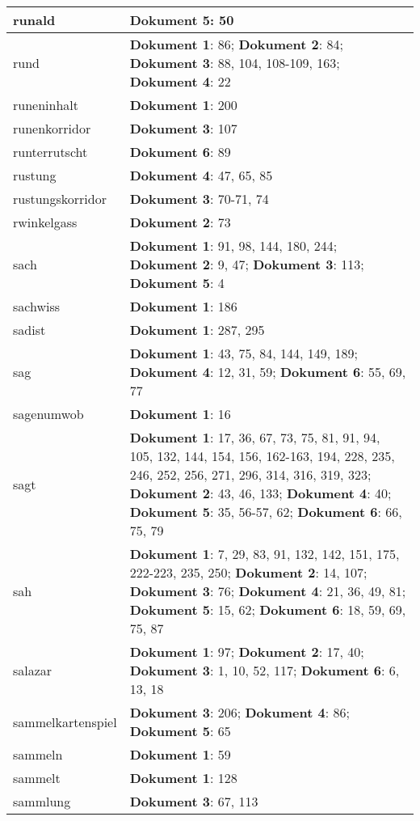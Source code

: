 \documentclass[a5paper]{article}
\begin{document}
\begin{longtable}[l]{|l|p{3in}|}
\hline
runald & \textbf{Dokument 5}: 50 \\
\hline
rund & \textbf{Dokument 1}: 86; \textbf{Dokument 2}: 84; \textbf{Dokument 3}: 88, 104, 108-109, 163; \textbf{Dokument 4}: 22 \\
\hline
runeninhalt & \textbf{Dokument 1}: 200 \\
\hline
runenkorridor & \textbf{Dokument 3}: 107 \\
\hline
runterrutscht & \textbf{Dokument 6}: 89 \\
\hline
rustung & \textbf{Dokument 4}: 47, 65, 85 \\
\hline
rustungskorridor & \textbf{Dokument 3}: 70-71, 74 \\
\hline
rwinkelgass & \textbf{Dokument 2}: 73 \\
\hline
sach & \textbf{Dokument 1}: 91, 98, 144, 180, 244; \textbf{Dokument 2}: 9, 47; \textbf{Dokument 3}: 113; \textbf{Dokument 5}: 4 \\
\hline
sachwiss & \textbf{Dokument 1}: 186 \\
\hline
sadist & \textbf{Dokument 1}: 287, 295 \\
\hline
sag & \textbf{Dokument 1}: 43, 75, 84, 144, 149, 189; \textbf{Dokument 4}: 12, 31, 59; \textbf{Dokument 6}: 55, 69, 77 \\
\hline
sagenumwob & \textbf{Dokument 1}: 16 \\
\hline
sagt & \textbf{Dokument 1}: 17, 36, 67, 73, 75, 81, 91, 94, 105, 132, 144, 154, 156, 162-163, 194, 228, 235, 246, 252, 256, 271, 296, 314, 316, 319, 323; \textbf{Dokument 2}: 43, 46, 133; \textbf{Dokument 4}: 40; \textbf{Dokument 5}: 35, 56-57, 62; \textbf{Dokument 6}: 66, 75, 79 \\
\hline
sah & \textbf{Dokument 1}: 7, 29, 83, 91, 132, 142, 151, 175, 222-223, 235, 250; \textbf{Dokument 2}: 14, 107; \textbf{Dokument 3}: 76; \textbf{Dokument 4}: 21, 36, 49, 81; \textbf{Dokument 5}: 15, 62; \textbf{Dokument 6}: 18, 59, 69, 75, 87 \\
\hline
salazar & \textbf{Dokument 1}: 97; \textbf{Dokument 2}: 17, 40; \textbf{Dokument 3}: 1, 10, 52, 117; \textbf{Dokument 6}: 6, 13, 18 \\
\hline
sammelkartenspiel & \textbf{Dokument 3}: 206; \textbf{Dokument 4}: 86; \textbf{Dokument 5}: 65 \\
\hline
sammeln & \textbf{Dokument 1}: 59 \\
\hline
sammelt & \textbf{Dokument 1}: 128 \\
\hline
sammlung & \textbf{Dokument 3}: 67, 113 \\

\end{longtable}
\end{document}
